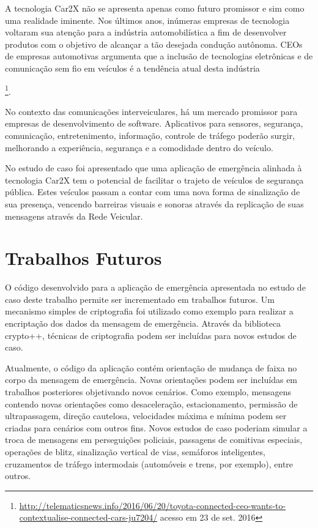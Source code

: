 \documentclass[
12pt,				%
openright,			%
oneside,			%
a4paper,			%
brazil,				%
]{abntex2}
\begin{document}
	\par A tecnologia Car2X não se apresenta apenas como futuro promissor e sim como uma realidade iminente. Nos últimos anos, inúmeras empresas de tecnologia voltaram sua atenção para a indústria automobilística a fim de desenvolver produtos com o objetivo de alcançar a tão desejada condução autônoma. CEOs de empresas automotivas argumenta que a inclusão de tecnologias eletrônicas e de comunicação sem fio em veículos é a tendência atual desta indústria{\footnote{\href{http://telematicsnews.info/2016/06/20/toyota-connected-ceo-wants-to-contextualise-connected-cars-ju7204/}{http://telematicsnews.info/2016/06/20/toyota-connected-ceo-wants-to-contextualise-connected-cars-ju7204/} acesso em 23 de set. 2016}.

	\par No contexto das comunicações interveiculares, há um mercado promissor para empresas de desenvolvimento de software. Aplicativos para sensores, segurança, comunicação, entretenimento, informação, controle de tráfego poderão surgir, melhorando a experiência, segurança e a comodidade dentro do veículo.

	\par No estudo de caso foi apresentado que uma aplicação de emergência alinhada à tecnologia Car2X tem o potencial de facilitar o trajeto de veículos de segurança pública. Estes veículos passam a contar com uma nova forma de sinalização de sua presença, vencendo barreiras visuais e sonoras através da replicação de suas mensagens através da Rede Veicular.


	\chapter*[Trabalhos Futuros]{Trabalhos Futuros}

	\par O código desenvolvido para a aplicação de emergência apresentada no estudo de caso deste trabalho permite ser incrementado em trabalhos futuros. Um mecanismo simples de criptografia foi utilizado como exemplo para realizar a encriptação dos dados da mensagem de emergência. Através da biblioteca crypto++, técnicas de criptografia podem ser incluídas para novos estudos de caso.

	\par Atualmente, o código da aplicação contém orientação de mudança de faixa no corpo da mensagem de emergência. Novas orientações podem ser incluídas em trabalhos posteriores objetivando novos cenários. Como exemplo, mensagens contendo novas orientações como desaceleração, estacionamento, permissão de ultrapassagem, direção cautelosa, velocidades máxima e mínima podem ser criadas para cenários com outros fins. Novos estudos de caso poderiam simular a troca de mensagens em perseguições policiais, passagens de comitivas especiais, operações de blitz, sinalização vertical de vias, semáforos inteligentes, cruzamentos de tráfego intermodais (automóveis e trens, por exemplo), entre outros.

}
\end{document}
